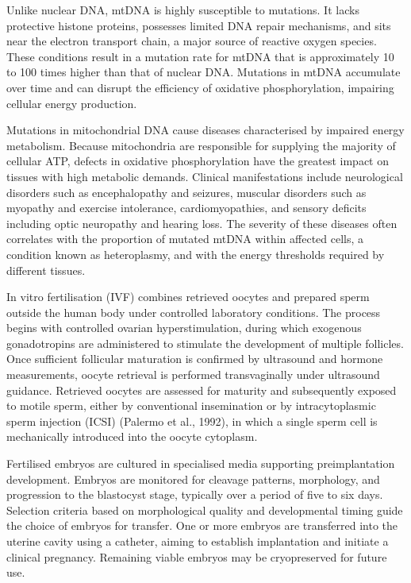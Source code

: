 Unlike nuclear DNA, mtDNA is highly susceptible to mutations. It lacks protective histone proteins, possesses limited DNA repair mechanisms, and sits near the electron transport chain, a major source of reactive oxygen species. These conditions result in a mutation rate for mtDNA that is approximately 10 to 100 times higher than that of nuclear DNA. Mutations in mtDNA accumulate over time and can disrupt the efficiency of oxidative phosphorylation, impairing cellular energy production.

Mutations in mitochondrial DNA cause diseases characterised by impaired energy metabolism. Because mitochondria are responsible for supplying the majority of cellular ATP, defects in oxidative phosphorylation have the greatest impact on tissues with high metabolic demands. Clinical manifestations include neurological disorders such as encephalopathy and seizures, muscular disorders such as myopathy and exercise intolerance, cardiomyopathies, and sensory deficits including optic neuropathy and hearing loss. The severity of these diseases often correlates with the proportion of mutated mtDNA within affected cells, a condition known as heteroplasmy, and with the energy thresholds required by different tissues.

In vitro fertilisation (IVF) combines retrieved oocytes and prepared sperm outside the human body under controlled laboratory conditions. The process begins with controlled ovarian hyperstimulation, during which exogenous gonadotropins are administered to stimulate the development of multiple follicles. Once sufficient follicular maturation is confirmed by ultrasound and hormone measurements, oocyte retrieval is performed transvaginally under ultrasound guidance. Retrieved oocytes are assessed for maturity and subsequently exposed to motile sperm, either by conventional insemination or by intracytoplasmic sperm injection (ICSI) (Palermo et al., 1992), in which a single sperm cell is mechanically introduced into the oocyte cytoplasm.

Fertilised embryos are cultured in specialised media supporting preimplantation development. Embryos are monitored for cleavage patterns, morphology, and progression to the blastocyst stage, typically over a period of five to six days. Selection criteria based on morphological quality and developmental timing guide the choice of embryos for transfer. One or more embryos are transferred into the uterine cavity using a catheter, aiming to establish implantation and initiate a clinical pregnancy. Remaining viable embryos may be cryopreserved for future use.

